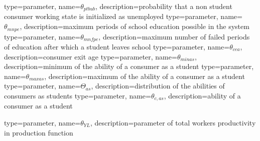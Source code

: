 {%
  type=parameter,%
  name={$\theta_{ptbub}$},%
  description={probability that a non student consumer working state is initialized as unemployed} 
}
{%
  type=parameter,%
  name={$\theta_{mnpe}$},%
  description={maximum periods of school education possible in the system} 
}
{%
  type=parameter,%
  name={$\theta_{mnfpe}$},%
  description={maximum number of failed periods of education after which a student leaves school} 
}
{%
  type=parameter,%
  name={$\theta_{cea}$},%
  description={consumer exit age} 
}
{%
  type=parameter,%
  name={$\theta_{minas}$},%
  description={minimum of the ability of a consumer as a student} 
}
{%
  type=parameter,%
  name={$\theta_{maxas}$},%
  description={maximum of the ability of a consumer as a student} 
}
{%
  type=parameter,%
  name={$\Theta_{as}$},%
  description={distribution of the abilities of consumers as students} 
}
{%
  type=parameter,%
  name={$\theta_{c,as}$},%
  description={ability of a consumer as a student} 
}
 
{%
  type=parameter,%
  name={$\theta_{YL}$},%
  description={parameter of total workers productivity in production function} 
}
 
